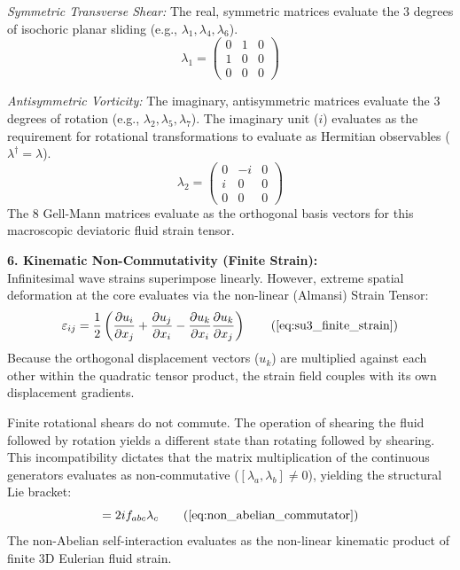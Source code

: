 \textit{Symmetric Transverse Shear:} The real, symmetric matrices evaluate the $3$ degrees of isochoric planar sliding (e.g., $\lambda_1, \lambda_4, \lambda_6$).
\begin{equation}
    \lambda_1 = \begin{pmatrix} 0 & 1 & 0 \\ 1 & 0 & 0 \\ 0 & 0 & 0 \end{pmatrix} 
\end{equation}

\textit{Antisymmetric Vorticity:} The imaginary, antisymmetric matrices evaluate the $3$ degrees of rotation (e.g., $\lambda_2, \lambda_5, \lambda_7$). The imaginary unit ($i$) evaluates as the requirement for rotational transformations to evaluate as Hermitian observables ($\lambda^\dagger = \lambda$).
\begin{equation}
    \lambda_2 = \begin{pmatrix} 0 & -i & 0 \\ i & 0 & 0 \\ 0 & 0 & 0 \end{pmatrix} 
\end{equation}
The $8$ Gell-Mann matrices evaluate as the orthogonal basis vectors for this macroscopic deviatoric fluid strain tensor. 

\vspace{0.2 cm}

\textbf{6. Kinematic Non-Commutativity (Finite Strain):} \\
Infinitesimal wave strains superimpose linearly. However, extreme spatial deformation at the core evaluates via the non-linear (Almansi) Strain Tensor:
\begin{equation}
    \varepsilon_{ij} = \frac{1}{2} \left( \frac{\partial u_i}{\partial x_j} + \frac{\partial u_j}{\partial x_i} - \frac{\partial u_k}{\partial x_i} \frac{\partial u_k}{\partial x_j} \right) \tag{\ref{eq:su3_finite_strain}}
\end{equation}
Because the orthogonal displacement vectors ($u_k$) are multiplied against each other within the quadratic tensor product, the strain field couples with its own displacement gradients. 

Finite rotational shears do not commute. The operation of shearing the fluid followed by rotation yields a different state than rotating followed by shearing. This incompatibility dictates that the matrix multiplication of the continuous generators evaluates as non-commutative ($[\lambda_a, \lambda_b] \neq 0$), yielding the structural Lie bracket:
\begin{equation}
    [\lambda_a, \lambda_b] = 2i f_{abc} \lambda_c \tag{\ref{eq:non_abelian_commutator}}
\end{equation}
The non-Abelian self-interaction evaluates as the non-linear kinematic product of finite 3D Eulerian fluid strain.

